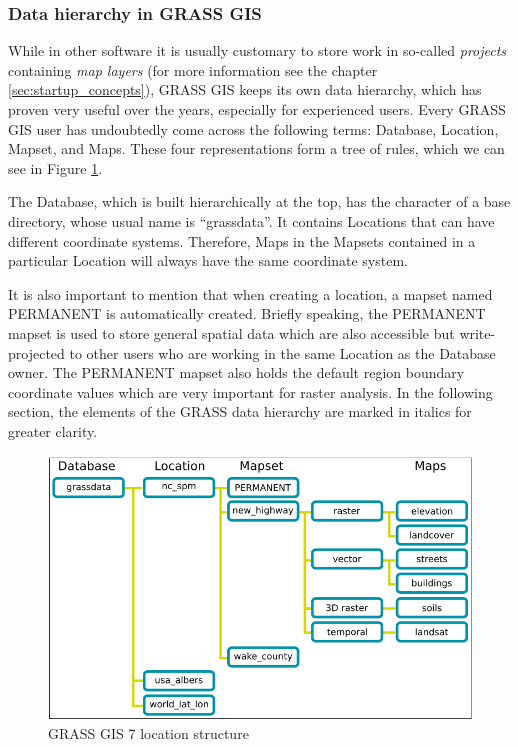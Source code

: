 \documentclass[a4paper,10pt,twoside]{article}
\begin{document}
\subsubsection{Data hierarchy in GRASS GIS}
\label{subsection:hierarchy}
\noindent
\large

\noindent While in other software it is usually customary to store work in so-called \textit{projects} containing \textit{map layers} (for more information see the chapter \ref{sec:startup_concepts}), GRASS GIS keeps its own data hierarchy, which has proven very useful over the years, especially for experienced users. Every GRASS GIS user has undoubtedly come across the following terms: Database, Location, Mapset, and Maps. These four representations form a tree of rules, which we can see in Figure \ref{fig:grass_data_hierarchy}.

The Database, which is built hierarchically at the top, has the character of a base directory, whose usual name is ``grassdata''. It contains Locations that can have different coordinate systems. Therefore, Maps in the Mapsets contained in a particular Location will always have the same coordinate system.

It is also important to mention that when creating a location, a mapset named PERMANENT is automatically created. Briefly speaking, the PERMANENT mapset is used to store general spatial data which are also accessible but write-projected to other users who are working in the same Location as the Database owner. The PERMANENT mapset also holds the default region boundary coordinate values which are very important for raster analysis. In the following section, the elements of the GRASS data hierarchy are marked in italics for greater clarity.

\vspace{0.3cm}
\begin{figure}[hbt!]
\begin{center}
\includegraphics[width=14cm]{../pictures/grass_data_hiearchy.png} 
\caption[GRASS GIS 7 location structure]{GRASS GIS 7 location structure}
\label{fig:grass_data_hierarchy}
\end{center}
\end{figure}
\end{document}
